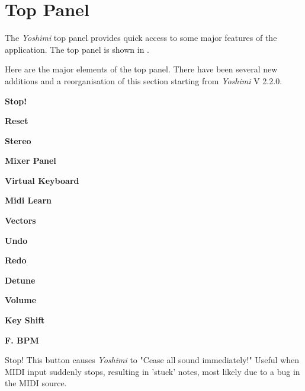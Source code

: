 %
%
%
\section{Top Panel}
\label{sec:top_panel}

   The \textsl{Yoshimi} top panel provides quick access to some major
   features of the application.
   The top panel is shown in
   .

   Here are the major elements of the top panel. There have been several
   new additions and a reorganisation of this section starting from
   \textsl{Yoshimi} V 2.2.0.

   \begin{enumber}
      \item \textbf{Stop!}
      \item \textbf{Reset}
      \item \textbf{Stereo}
      \item \textbf{Mixer Panel}
      \item \textbf{Virtual Keyboard}
      \item \textbf{Midi Learn}
      \item \textbf{Vectors}
      \item \textbf{Undo}
      \item \textbf{Redo}
      \item \textbf{Detune}
      \item \textbf{Volume}
      \item \textbf{Key Shift}
      \item \textbf{F. BPM}
   \end{enumber}

   \setcounter{ItemCounter}{0}      %

   Stop!
   This button causes \textsl{Yoshimi} to
   "Cease all sound immediately!"
   Useful when MIDI input suddenly stops, resulting in 'stuck' notes, most
   likely due to a bug in the MIDI source.

